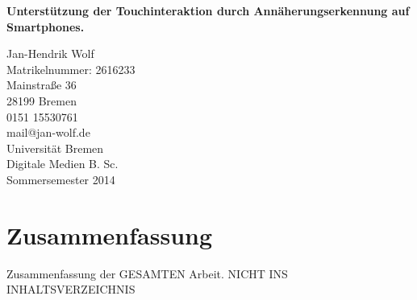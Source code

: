 \documentclass[a4paper,12pt,bibliography=totoc]{scrreprt}%
\begin{document}
\begin{titlepage}
\begin{center}
\null
\vfill
\begin{Large}
\textsf{\textbf{Unterstützung der Touchinteraktion durch Annäherungserkennung auf Smartphones.}}
\end{Large}\linebreak \linebreak 
\begin{large}
\end{large}
\begin{small}
\vfill{Jan-Hendrik Wolf \\ Matrikelnummer: 2616233 \\ Mainstraße 36 \\  28199 Bremen \\ 0151 15530761\\ mail@jan-wolf.de \\\vspace{3cm} Universität Bremen\\ Digitale Medien B. Sc. \\ Sommersemester 2014}
\null
\end{small}
\end{center}
\end{titlepage}

\tableofcontents
\thispagestyle{empty}
\clearpage
\onehalfspacing
\pagestyle{plain}

\chapter*{Zusammenfassung}
Zusammenfassung der GESAMTEN Arbeit. NICHT INS INHALTSVERZEICHNIS
\end{document}
